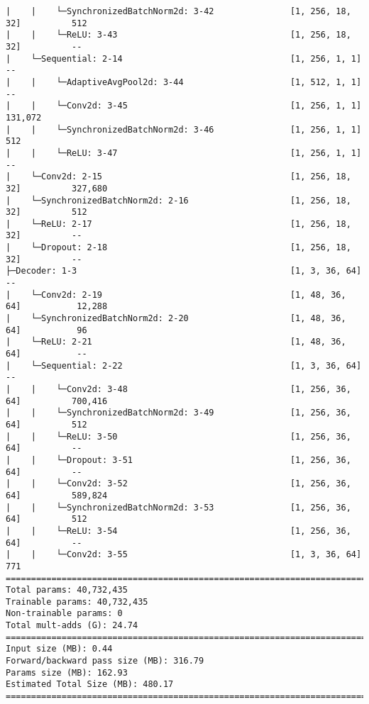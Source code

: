 \begin{verbatim}
|    |    └─SynchronizedBatchNorm2d: 3-42               [1, 256, 18, 32]          512
|    |    └─ReLU: 3-43                                  [1, 256, 18, 32]          --
|    └─Sequential: 2-14                                 [1, 256, 1, 1]            --
|    |    └─AdaptiveAvgPool2d: 3-44                     [1, 512, 1, 1]            --
|    |    └─Conv2d: 3-45                                [1, 256, 1, 1]            131,072
|    |    └─SynchronizedBatchNorm2d: 3-46               [1, 256, 1, 1]            512
|    |    └─ReLU: 3-47                                  [1, 256, 1, 1]            --
|    └─Conv2d: 2-15                                     [1, 256, 18, 32]          327,680
|    └─SynchronizedBatchNorm2d: 2-16                    [1, 256, 18, 32]          512
|    └─ReLU: 2-17                                       [1, 256, 18, 32]          --
|    └─Dropout: 2-18                                    [1, 256, 18, 32]          --
├─Decoder: 1-3                                          [1, 3, 36, 64]            --
|    └─Conv2d: 2-19                                     [1, 48, 36, 64]           12,288
|    └─SynchronizedBatchNorm2d: 2-20                    [1, 48, 36, 64]           96
|    └─ReLU: 2-21                                       [1, 48, 36, 64]           --
|    └─Sequential: 2-22                                 [1, 3, 36, 64]            --
|    |    └─Conv2d: 3-48                                [1, 256, 36, 64]          700,416
|    |    └─SynchronizedBatchNorm2d: 3-49               [1, 256, 36, 64]          512
|    |    └─ReLU: 3-50                                  [1, 256, 36, 64]          --
|    |    └─Dropout: 3-51                               [1, 256, 36, 64]          --
|    |    └─Conv2d: 3-52                                [1, 256, 36, 64]          589,824
|    |    └─SynchronizedBatchNorm2d: 3-53               [1, 256, 36, 64]          512
|    |    └─ReLU: 3-54                                  [1, 256, 36, 64]          --
|    |    └─Conv2d: 3-55                                [1, 3, 36, 64]            771
=========================================================================================================
Total params: 40,732,435
Trainable params: 40,732,435
Non-trainable params: 0
Total mult-adds (G): 24.74
=========================================================================================================
Input size (MB): 0.44
Forward/backward pass size (MB): 316.79
Params size (MB): 162.93
Estimated Total Size (MB): 480.17
=========================================================================================================


\end{verbatim}

